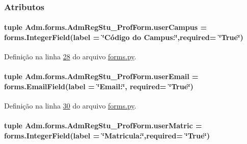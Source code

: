 \subsubsection{Atributos}
\hypertarget{classAdm_1_1forms_1_1AdmRegStu__ProfForm_a885786ae8be597f051f8e3ff65ddb02d}{
\paragraph[{user\-Campus}]{\setlength{\rightskip}{0pt plus 5cm}tuple Adm.\-forms.\-Adm\-Reg\-Stu\-\_\-\-Prof\-Form.\-user\-Campus = forms.\-Integer\-Field(label = \char`\"{}Código do Campus\-:\char`\"{},required= \char`\"{}True\char`\"{})\hspace{0.3cm}{\ttfamily [static]}}}\label{classAdm_1_1forms_1_1AdmRegStu__ProfForm_a885786ae8be597f051f8e3ff65ddb02d}


Definição na linha \hyperlink{Adm_2forms_8py_source_l00028}{28} do arquivo \hyperlink{Adm_2forms_8py_source}{forms.\-py}.

\hypertarget{classAdm_1_1forms_1_1AdmRegStu__ProfForm_a97ccca87a1c1c3a223e13d51e8196ef4}{
\paragraph[{user\-Email}]{\setlength{\rightskip}{0pt plus 5cm}tuple Adm.\-forms.\-Adm\-Reg\-Stu\-\_\-\-Prof\-Form.\-user\-Email = forms.\-Email\-Field(label = \char`\"{}Email\-:\char`\"{}, required= \char`\"{}True\char`\"{})\hspace{0.3cm}{\ttfamily [static]}}}\label{classAdm_1_1forms_1_1AdmRegStu__ProfForm_a97ccca87a1c1c3a223e13d51e8196ef4}


Definição na linha \hyperlink{Adm_2forms_8py_source_l00030}{30} do arquivo \hyperlink{Adm_2forms_8py_source}{forms.\-py}.

\hypertarget{classAdm_1_1forms_1_1AdmRegStu__ProfForm_a8cd50b9437effd2fecd6e4c66c307e41}{
\paragraph[{user\-Matric}]{\setlength{\rightskip}{0pt plus 5cm}tuple Adm.\-forms.\-Adm\-Reg\-Stu\-\_\-\-Prof\-Form.\-user\-Matric = forms.\-Integer\-Field(label = \char`\"{}Matricula\-:\char`\"{},required= \char`\"{}True\char`\"{})\hspace{0.3cm}{\ttfamily [static]}}}\label{classAdm_1_1forms_1_1AdmRegStu__ProfForm_a8cd50b9437effd2fecd6e4c66c307e41}


